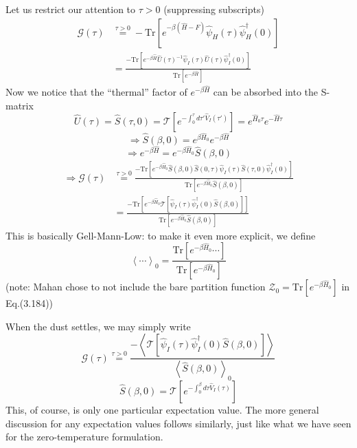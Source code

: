 Let us restrict our attention to $\tau >0$ (suppressing subscripts)
\begin{align*}
    \mathcal{G} \left( \tau \right) &\stackrel{\tau >0}{=}-\mathrm{Tr}\left[ e^{-\beta \left( \hat{H}-F \right)}\hat{\psi}_H\left( \tau \right) \hat{\psi}_{H}^{\dagger}\left( 0 \right) \right] \\
    &=\frac{-\mathrm{Tr}\left[ e^{-\beta \hat{H}}\hat{U}\left( \tau \right) ^{-1}\hat{\psi}_I\left( \tau \right) \hat{U}\left( \tau \right) \hat{\psi}_{I}^{\dagger}\left( 0 \right) \right]}{\mathrm{Tr}\left[ e^{-\beta \hat{H}} \right]}
\end{align*}
Now we notice that the ``thermal'' factor of $e^{-\beta \hat{H}}$ can be absorbed into the S-matrix
\[ \hat{U}\left( \tau \right) =\hat{S}\left( \tau ,0 \right) =\mathcal{T} \left[ e^{-\int_0^{\tau}{d\tau '\hat{V}_I\left( \tau ' \right)}} \right] =e^{\hat{H}_0\tau}e^{-\hat{H}\tau}\]
\[ \Rightarrow \hat{S}\left( \beta ,0 \right) =e^{\beta \hat{H}_0}e^{-\beta \hat{H}}\]
\[ \Rightarrow e^{-\beta \hat{H}}=e^{-\beta \hat{H}_0}\hat{S}\left( \beta ,0 \right) \]
\begin{align*}
    \Rightarrow \mathcal{G} \left( \tau \right) &\stackrel{\tau >0}{=}\frac{-\mathrm{Tr}\left[ e^{-\beta \hat{H}_0}\hat{S}\left( \beta ,0 \right) \hat{S}\left( 0,\tau \right) \hat{\psi}_I\left( \tau \right) \hat{S}\left( \tau ,0 \right) \hat{\psi}_{I}^{\dagger}\left( 0 \right) \right]}{\mathrm{Tr}\left[ e^{-\beta \hat{H}_0}\hat{S}\left( \beta ,0 \right) \right]}\\
    &=\frac{-\mathrm{Tr}\left[ e^{-\beta \hat{H}_0}\mathcal{T} \left[ \hat{\psi}_I\left( \tau \right) \hat{\psi}_{I}^{\dagger}\left( 0 \right) \hat{S}\left( \beta ,0 \right) \right] \right]}{\mathrm{Tr}\left[ e^{-\beta \hat{H}_0}\hat{S}\left( \beta ,0 \right) \right]}
\end{align*}
This is basically Gell-Mann-Low: to make it even more explicit, we define
\[ \left< \cdots \right> _0=\frac{\mathrm{Tr}\left[ e^{-\beta \hat{H}_0}\cdots \right]}{\mathrm{Tr}\left[ e^{-\beta \hat{H}_0} \right]}\]
(note: Mahan chose to not include the bare partition function $\mathcal{Z} _0=\mathrm{Tr}\left[ e^{-\beta \hat{H}_0} \right] $ in Eq.(3.184))

When the dust settles, we may simply write
\[ \mathcal{G} \left( \tau \right) \stackrel{\tau >0}{=}\frac{-\left< \mathcal{T} \left[ \hat{\psi}_I\left( \tau \right) \hat{\psi}_{I}^{\dagger}\left( 0 \right) \hat{S}\left( \beta ,0 \right) \right] \right>}{\left< \hat{S}\left( \beta ,0 \right) \right> _0}\]
\[ \hat{S}\left( \beta ,0 \right) =\mathcal{T} \left[ e^{-\int_0^{\beta}{d\tau \hat{V}_I\left( \tau \right)}} \right] \]
This, of course, is only one particular expectation value. The more general discussion for any expectation values follows similarly, just like what we have seen for the zero-temperature formulation.

